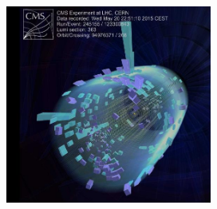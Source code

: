 \begin{figure}[b!] 
    \centering
    \includegraphics[height=6.5cm]{figures/analysis/search1/misc/first_coll.png}
\end{figure}

\vspace*{\fill}

\clearpage

\clearpage


